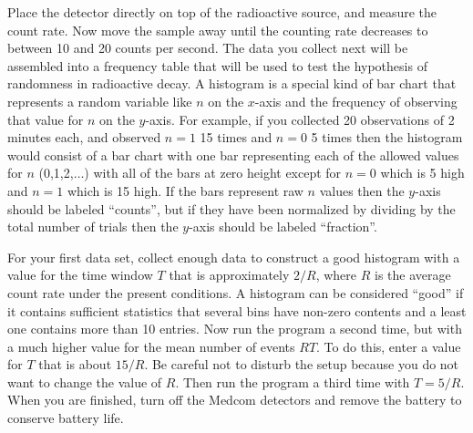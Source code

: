 \documentclass{revtex4}
\begin{document}
Place the detector directly on top of the radioactive source, and measure
the count rate.  Now move the sample away until the counting rate decreases
to between 10 and 20 counts per second.  The data you collect next will be
assembled into a frequency table that will be used to test the hypothesis
of randomness in radioactive decay.  A histogram is a special kind of bar
chart that represents a random variable like $n$ on the $x$-axis and the
frequency of observing that value for $n$ on the $y$-axis.  For example, if
you collected 20 observations of 2 minutes each, and observed $n=1$ 15 times
and $n=0$ 5 times then the histogram would consist of a bar chart with one
bar representing each of the allowed values for $n$ (0,1,2,$\ldots$) with
all of the bars at zero height except for $n=0$ which is 5 high and $n=1$
which is 15 high.  If the bars represent raw $n$ values then the $y$-axis
should be labeled ``counts'', but if they have been normalized by dividing
by the total number of trials then the $y$-axis should be labeled ``fraction''.

For your first data set, collect enough data to construct a good histogram
with a value for the time window $T$ that is approximately $2/R$, where $R$
is the average count rate under the present conditions.  A histogram can be
considered ``good'' if it contains sufficient statistics that several bins
have non-zero contents and a least one contains more than 10 entries.
Now run the program a second time, but with a much higher value for the mean
number of events $RT$.  To do this, enter a value for $T$ that is about $15/R$.
Be careful not to disturb the setup because you do not want to change the
value of $R$.   Then run the program a third time with $T=5/R$.  When
you are finished, turn off the Medcom detectors and remove the battery to
conserve battery life.
\end{document}
